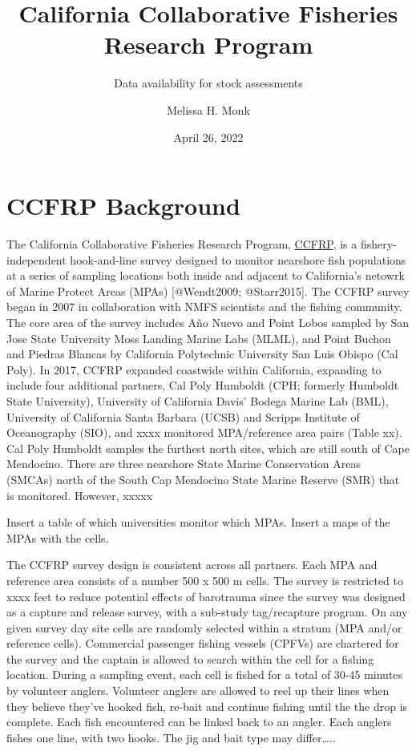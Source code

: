 \documentclass[
]{article}
\title{California Collaborative Fisheries Research Program}
\subtitle{Data availability for stock assessments}
\author{Melissa H. Monk}
\date{April 26, 2022}
\begin{document}
\maketitle

\hypertarget{ccfrp-background}{%
\section{CCFRP Background}\label{ccfrp-background}}

The California Collaborative Fisheries Research Program,
\href{https://www.mlml.calstate.edu/ccfrp/}{CCFRP},
is a fishery-independent hook-and-line survey designed to monitor nearshore fish
populations at a series of sampling
locations both inside and adjacent to California's netowrk of Marine Protect Areas
(MPAs) {[}@Wendt2009; @Starr2015{]}. The CCFRP survey began in 2007 in collaboration
with NMFS scientists and the fishing community. The core area of the survey includes
Año Nuevo and Point Lobos sampled by San Jose State University Moss Landing
Marine Labs (MLML), and Point Buchon and Piedras Blancas by California Polytechnic University
San Luis Obispo (Cal Poly). In 2017, CCFRP expanded coastwide within California, expanding
to include four additional partners, Cal Poly Humboldt (CPH; formerly Humboldt State
University), University of California Davis' Bodega Marine Lab (BML), University
of California Santa Barbara (UCSB) and Scripps Institute of Oceanography (SIO), and
xxxx monitored MPA/reference area pairs (Table xx). Cal Poly Humboldt samples the
furthest north sites, which are still south of Cape Mendocino. There are three
nearshore State Marine Conservation Areas (SMCAs) north of the South Cap Mendocino
State Marine Reserve (SMR) that is monitored. However, xxxxx

Insert a table of which universities monitor which MPAs. Insert a maps of the
MPAs with the cells.

The CCFRP survey design is consistent across all partners. Each MPA and reference
area consists of a number 500 x 500 m cells. The survey is restricted to xxxx feet
to reduce potential effects of barotrauma since the survey was designed as a capture
and release survey, with a sub-study tag/recapture program. On any given survey day site cells
are randomly selected within a stratum (MPA and/or reference cells). Commercial
passenger fishing vessels (CPFVs) are chartered for the survey and the captain
is allowed to search within the cell for a fishing location. During a sampling
event, each cell is fished for a total of 30-45 minutes by volunteer anglers. Volunteer
anglers are allowed to reel up their lines when they believe they've hooked fish,
re-bait and continue fishing until the the drop is complete. Each fish encountered
can be linked back to an angler. Each anglers fishes one line, with two hooks.
The jig and bait type may differ\ldots..
\end{document}
